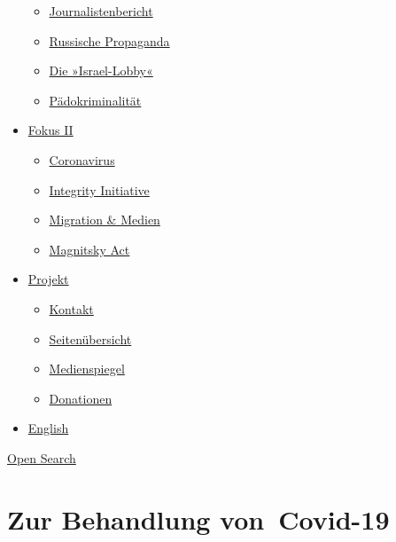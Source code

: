 \begin{itemize}
  \begin{itemize}
  \tightlist
  \item
    \href{https://swprs.org/bericht-eines-journalisten/}{Journalistenbericht}
  \item
    \href{https://swprs.org/russische-propaganda/}{Russische Propaganda}
  \item
    \href{https://swprs.org/die-israel-lobby-fakten-und-mythen/}{Die
    »Israel-Lobby«}
  \item
    \href{https://swprs.org/geopolitik-und-paedokriminalitaet/}{Pädokriminalität}
  \end{itemize}
\item
  \href{https://swprs.org/migration-und-medien/}{Fokus II}

  \begin{itemize}
  \tightlist
  \item
    \href{https://swprs.org/covid-19-hinweis-ii/}{Coronavirus}
  \item
    \href{https://swprs.org/die-integrity-initiative/}{Integrity
    Initiative}
  \item
    \href{https://swprs.org/migration-und-medien/}{Migration \& Medien}
  \item
    \href{https://swprs.org/der-fall-magnitsky/}{Magnitsky Act}
  \end{itemize}
\item
  \href{https://swprs.org/kontakt/}{Projekt}

  \begin{itemize}
  \tightlist
  \item
    \href{https://swprs.org/kontakt/}{Kontakt}
  \item
    \href{https://swprs.org/uebersicht/}{Seitenübersicht}
  \item
    \href{https://swprs.org/medienspiegel/}{Medienspiegel}
  \item
    \href{https://swprs.org/donationen/}{Donationen}
  \end{itemize}
\item
  \href{https://swprs.org/contact/}{English}
\end{itemize}

\protect\hyperlink{}{Open Search}

\hypertarget{zur-behandlung-von-covid-19}{%
\section{Zur Behandlung
von~Covid-19}\label{zur-behandlung-von-covid-19}}

